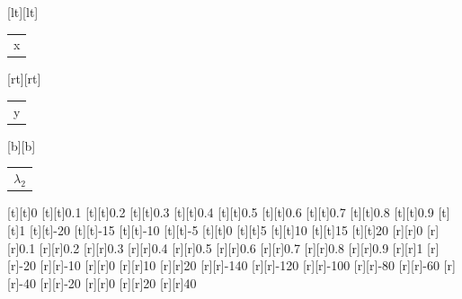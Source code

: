 %    
%
%
\begin{psfrags}%
\psfragscanon%
%
[lt][lt]{\color[rgb]{0,0,0}\setlength{\tabcolsep}{0pt}\begin{tabular}{l}{x}\end{tabular}}%
[rt][rt]{\color[rgb]{0,0,0}\setlength{\tabcolsep}{0pt}\begin{tabular}{r}{y}\end{tabular}}%
[b][b]{\color[rgb]{0,0,0}\setlength{\tabcolsep}{0pt}\begin{tabular}{c}$\lambda_2$\end{tabular}}%
%
[t][t]{0}%
[t][t]{0.1}%
[t][t]{0.2}%
[t][t]{0.3}%
[t][t]{0.4}%
[t][t]{0.5}%
[t][t]{0.6}%
[t][t]{0.7}%
[t][t]{0.8}%
[t][t]{0.9}%
[t][t]{1}%
[t][t]{-20}%
[t][t]{-15}%
[t][t]{-10}%
[t][t]{-5}%
[t][t]{0}%
[t][t]{5}%
[t][t]{10}%
[t][t]{15}%
[t][t]{20}%
%
[r][r]{0}%
[r][r]{0.1}%
[r][r]{0.2}%
[r][r]{0.3}%
[r][r]{0.4}%
[r][r]{0.5}%
[r][r]{0.6}%
[r][r]{0.7}%
[r][r]{0.8}%
[r][r]{0.9}%
[r][r]{1}%
[r][r]{-20}%
[r][r]{-10}%
[r][r]{0}%
[r][r]{10}%
[r][r]{20}%
%
[r][r]{-140}%
[r][r]{-120}%
[r][r]{-100}%
[r][r]{-80}%
[r][r]{-60}%
[r][r]{-40}%
[r][r]{-20}%
[r][r]{0}%
[r][r]{20}%
[r][r]{40}%
%
%
\end{psfrags}%
%
